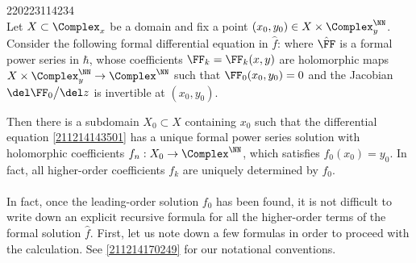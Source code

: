 \documentclass[11pt]{article}
\begin{document}
\begin{lem}{220223114234}
\mbox{}\\
Let $X \subset \Complex_x$ be a domain and fix a point $(x_0, y_0) \in X \times \Complex^\NN_y$.
Consider the following formal differential equation in $\hat{f}$:
where $\hat{\FF}$ is a formal power series in $\hbar$,
\vspace{-5pt}
whose coefficients $\FF_k = \FF_k (x, y)$ are holomorphic maps $X \times \Complex^\NN_y \to \Complex^\NN$ such that $\FF_0 (x_0, y_0) = 0$ and the Jacobian $\del \FF_0 \big/ \del z$ is invertible at $(x_0, y_0)$.

Then there is a subdomain $X_0 \subset X$ containing $x_0$ such that the differential equation \eqref{211214143501} has a unique formal power series solution
with holomorphic coefficients $f_n : X_0 \to \Complex^\NN$, which satisfies $f_0 (x_0) = y_0$.
In fact, all higher-order coefficients $f_k$ are uniquely determined by $f_0$.
\end{lem}

\paragraph{}
In fact, once the leading-order solution $f_0$ has been found, it is not difficult to write down an explicit recursive formula for all the higher-order terms of the formal solution $\hat{f}$.
First, let us note down a few formulas in order to proceed with the calculation.
See \autoref{211214170249} for our notational conventions.
\end{document}
